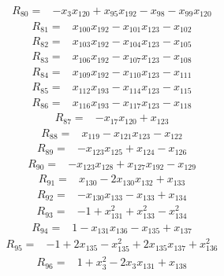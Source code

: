 \begin{align*} R_{80}={}&-x_{3}x_{120} +x_{95}x_{192} -x_{98} -x_{99}x_{120}
\end{align*}
\begin{align*} R_{81}={}&x_{100}x_{192} -x_{101}x_{123} -x_{102}
\end{align*}
\begin{align*} R_{82}={}&x_{103}x_{192} -x_{104}x_{123} -x_{105}
\end{align*}
\begin{align*} R_{83}={}&x_{106}x_{192} -x_{107}x_{123} -x_{108}
\end{align*}
\begin{align*} R_{84}={}&x_{109}x_{192} -x_{110}x_{123} -x_{111}
\end{align*}
\begin{align*} R_{85}={}&x_{112}x_{193} -x_{114}x_{123} -x_{115}
\end{align*}
\begin{align*} R_{86}={}&x_{116}x_{193} -x_{117}x_{123} -x_{118}
\end{align*}
\begin{align*} R_{87}={}&-x_{17}x_{120} +x_{123}
\end{align*}
\begin{align*} R_{88}={}&x_{119} -x_{121}x_{123} -x_{122}
\end{align*}
\begin{align*} R_{89}={}&-x_{123}x_{125} +x_{124} -x_{126}
\end{align*}
\begin{align*} R_{90}={}&-x_{123}x_{128} +x_{127}x_{192} -x_{129}
\end{align*}
\begin{align*} R_{91}={}&x_{130} -2 x_{130}x_{132} +x_{133}
\end{align*}
\begin{align*} R_{92}={}&-x_{130}x_{133} -x_{133} +x_{134}
\end{align*}
\begin{align*} R_{93}={}&-1 +x_{131}^{2} +x_{133}^{2} -x_{134}^{2}
\end{align*}
\begin{align*} R_{94}={}&1 -x_{131}x_{136} -x_{135} +x_{137}
\end{align*}
\begin{align*} R_{95}={}&-1 +2 x_{135} -x_{135}^{2} +2 x_{135}x_{137} +x_{136}^{2}
\end{align*}
\begin{align*} R_{96}={}&1 +x_{3}^{2} -2 x_{3}x_{131} +x_{138}
\end{align*}
